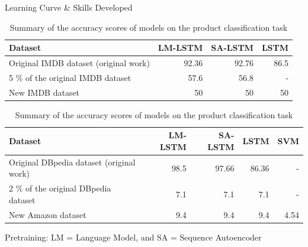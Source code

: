 \documentclass[aspectratio=169,xcolor=dvipsnames]{beamer}
\begin{document}
\begin{frame}{Learning Curve \& Skills Developed}
    \tableofcontents

\begin{table}[h!]
    \begin{center}
    
    \caption{Summary of the accuracy scores of models on the IMDB sentiment classification task}
    \label{tab:table1}
    \begin{tabular}{|l|r|r|r|} %
      \hline
      \textbf{Dataset} & \textbf{LM-LSTM} & \textbf{SA-LSTM} & \textbf{LSTM} \\
      \hline
      Original IMDB dataset (original work) & 92.36 & 92.76 & 86.5 \\
      5 \% of the original IMDB dataset & 57.6 & 56.8 & - \\
      New IMDB dataset & 50 & 50 & 50 \\
      \hline
    \end{tabular}
    
    \caption{Summary of the accuracy scores of models on the product classification task}
    \label{tab:table2}
    \begin{tabular}{|l|r|r|r|r|} 
      \hline
      \textbf{Dataset} & \textbf{LM-LSTM} & \textbf{SA-LSTM} & \textbf{LSTM} & \textbf{SVM}\\
      \hline
      Original DBpedia dataset (original work) & 98.5 & 97.66 & 86.36 & -\\
      2 \% of the original DBpedia dataset & 7.1 & 7.1 & 7.1 & - \\
      New Amazon dataset & 9.4 & 9.4 & 9.4 & 4.54\\
      \hline
    \end{tabular}
    \break
    \break
    \footnotesize{Pretraining: LM =  Language Model, and SA = Sequence Autoencoder}
  \end{center}
\end{table}

\end{frame}
\end{document}
